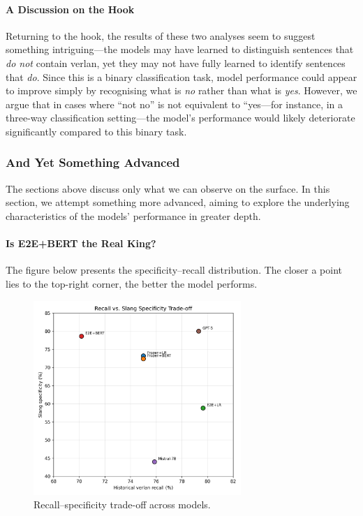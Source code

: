 \documentclass[12pt]{article}
\begin{document}
\paragraph{A Discussion on the Hook}
Returning to the hook, the results of these two analyses seem to suggest something intriguing\;---\;the models may have learned to distinguish sentences that \textit{do not} contain verlan, yet they may not have fully learned to identify sentences that \textit{do}. 
Since this is a binary classification task, model performance could appear to improve simply by recognising what is \textit{no} rather than what is \textit{yes}. 
However, we argue that in cases where “not no” is not equivalent to “yes\;---\;for instance, in a three-way classification setting\;---\;the model's performance would likely deteriorate significantly compared to this binary task.

\subsubsection{And Yet Something Advanced}

The sections above discuss only what we can observe on the surface. 
In this section, we attempt something more advanced, aiming to explore the underlying characteristics of the models' performance in greater depth.

\paragraph{Is E2E+BERT the Real King?}

The figure below presents the specificity--recall distribution. 
The closer a point lies to the top-right corner, the better the model performs.

\begin{figure}[H]
    \centering
    \includegraphics[width=0.7\textwidth]{figures/historical_vs_slang_tradeoff.png}
    \caption{Recall--specificity trade-off across models.}
    \label{fig:tradeoff-scatter}
\end{figure}
\end{document}
